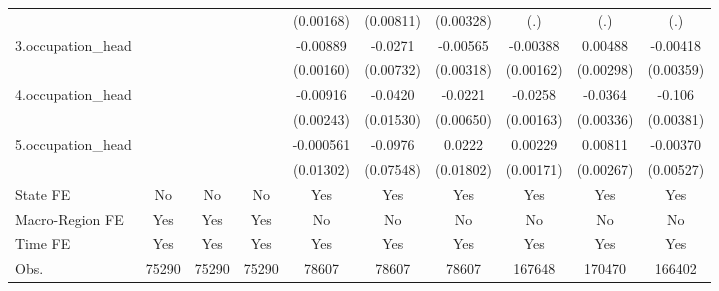 \begin{table}[htbp]
\begin{tabular}{l*{9}{c}}
            &                     &                     &                     &   (0.00168)         &   (0.00811)         &   (0.00328)         &         (.)         &         (.)         &         (.)         \\
3.occupation\_head&                     &                     &                     &    -0.00889\sym{***}&     -0.0271\sym{***}&    -0.00565\sym{*}  &    -0.00388\sym{**} &     0.00488         &    -0.00418         \\
            &                     &                     &                     &   (0.00160)         &   (0.00732)         &   (0.00318)         &   (0.00162)         &   (0.00298)         &   (0.00359)         \\
4.occupation\_head&                     &                     &                     &    -0.00916\sym{***}&     -0.0420\sym{***}&     -0.0221\sym{***}&     -0.0258\sym{***}&     -0.0364\sym{***}&      -0.106\sym{***}\\
            &                     &                     &                     &   (0.00243)         &   (0.01530)         &   (0.00650)         &   (0.00163)         &   (0.00336)         &   (0.00381)         \\
5.occupation\_head&                     &                     &                     &   -0.000561         &     -0.0976         &      0.0222         &     0.00229         &     0.00811\sym{***}&    -0.00370         \\
            &                     &                     &                     &   (0.01302)         &   (0.07548)         &   (0.01802)         &   (0.00171)         &   (0.00267)         &   (0.00527)         \\
State FE    &          No         &          No         &          No         &         Yes         &         Yes         &         Yes         &         Yes         &         Yes         &         Yes         \\
Macro-Region FE &         Yes         &         Yes         &         Yes         &          No         &          No         &          No         &          No         &          No         &          No         \\
Time FE     &         Yes         &         Yes         &         Yes         &         Yes         &         Yes         &         Yes         &         Yes         &         Yes         &         Yes         \\
\hline
Obs.        &       75290         &       75290         &       75290         &       78607         &       78607         &       78607         &      167648         &      170470         &      166402         \\

\end{tabular}
\end{table}
